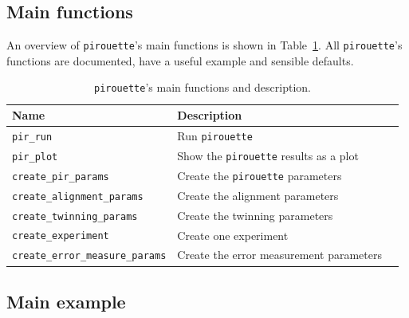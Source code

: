 \subsection{Main functions}
\label{subsec:main_functions}

An overview of \verb;pirouette;'s main functions is shown in 
Table~\ref{tab:functions}. 
All \verb;pirouette;'s functions are documented,
have a useful example and sensible defaults.

\begin{table}[h]
  \centering
  \begin{tabular}{ | l | l | l | }
    \hline
    \textbf{Name} & \textbf{Description} \\
    \hline
    \verb;pir_run; & Run \verb;pirouette; \\
    \verb;pir_plot; & Show the \verb;pirouette; results as a plot  \\
    \verb;create_pir_params; & Create the \verb;pirouette; parameters  \\
    \hline
    \verb;create_alignment_params; & Create the alignment parameters  \\
    \verb;create_twinning_params; & Create the twinning parameters  \\
    \verb;create_experiment; & Create one experiment  \\
    \verb;create_error_measure_params; & Create the error measurement parameters  \\
    \hline
  \end{tabular}
  \caption{
    \texttt{pirouette}'s main functions and description. 
  }
  \label{tab:functions}
\end{table}

\newpage

\subsection{Main example}
\label{subsec:main_example}

